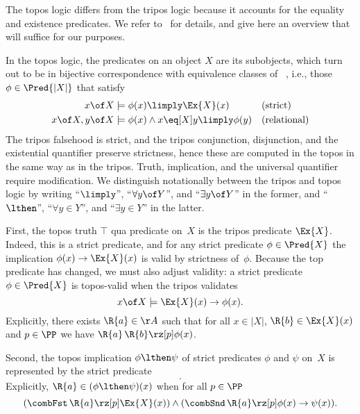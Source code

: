 The topos logic differs from the tripos logic because it accounts for the equality and existence predicates. We refer to~\cite[\S2.3]{oosten08:_realiz} for details, and give here an overview that will suffice for our purposes.

In the topos logic, the predicates on an object $X$ are its subobjects, which turn out to be in
bijective correspondence with equivalence classes of ~\cite[Thm.~2.2.1]{oosten08:_realiz}, i.e., those $\phi \in \Pred{|X|}$ that satisfy
%
\begin{align*}
  x \of X &\models \phi(x) \limply \Ex{X}(x) & &\text{(strict)} \\
  x \of X, y \of X &\models \phi(x) \land x \eq[X] y \limply \phi(y) & &\text{(relational)}
\end{align*}
%
The tripos falsehood is strict, and the tripos conjunction, disjunction, and the existential quantifier preserve strictness, hence these are computed in the topos in the same way as in the tripos. Truth, implication, and the universal quantifier require modification. We distinguish notationally between the tripos and topos logic by writing
``$\limply$'', ``$\forall y \of Y$'', and ``$\exists y \of Y$'' in the former, and
``$\lthen$'',  ``$\forall y \in Y$'', and ``$\exists y \in Y$'' in the latter.

First, the topos truth $\top$ qua predicate on~$X$ is the tripos predicate $\Ex{X}$. Indeed, this is a strict predicate, and for any strict predicate $\phi \in \Pred{X}$ the implication $\phi(x) \to \Ex{X}(x)$ is valid by strictness of~$\phi$. Because the top predicate has changed, we must also adjust validity: a strict predicate $\phi \in \Pred{X}$ is topos-valid when the tripos validates
%
\begin{equation*}
  x \of X \models \Ex{X}(x) \to \phi(x).
\end{equation*}
%
Explicitly, there exists $\R{a} \in \AA$ such that for all $x \in |X|$, $\R{b} \in \Ex{X}(x)$ and $p \in \PP$ we have $\R{a} \, \R{b} \rz[p] \phi(x)$.

Second, the topos implication $\phi \lthen \psi$ of strict predicates  $\phi$ and $\psi$ on~$X$ is represented by the strict predicate
%
\begin{equation*}
  [x \of X \mid \Ex{X}(x) \land (\phi(x) \limply \psi(x))].
\end{equation*}
%
Explicitly, $\R{a} \in (\phi \lthen \psi)(x)$ when for all $p \in \PP$
%
\begin{equation*}
  (\combFst \, \R{a} \rz[p] \Ex{X}(x))
  \land
  (\combSnd \, \R{a} \rz[p] \phi(x) \to \psi(x)).
\end{equation*}

